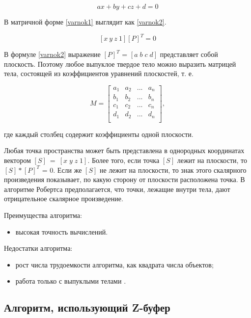 \begin{equation}
	\label{varnok1}
	ax+by+cz+d = 0
\end{equation}

В матричной форме \ref{varnok1} выглядит как \ref{varnok2}.

\begin{equation}
	\label{varnok2}
	[x \: y \: z \: 1][P]^T = 0
\end{equation}

В формуле \ref{varnok2} выражение $[P]^T$ = $[a \; b \; c \; d]$ представляет собой плоскость. Поэтому любое выпуклое твердое тело можно выразить матрицей тела, состоящей из коэффициентов уравнений плоскостей, т. е.

\begin{equation}
	M = \begin{bmatrix}
		a_1 & a_2 & ... & a_n           \\[0.3em]
		b_1 & b_2 & ... & b_n           \\[0.3em]
		c_1 & c_2 & ... & c_n           \\[0.3em]
		d_1 & d_2 & ... & d_n           \\[0.3em]
	\end{bmatrix},
\end{equation}

где каждый столбец содержит коэффициенты одной плоскости.

Любая точка пространства может быть представлена в однородных координатах вектором $[S]~=~[x \; y \; z \; 1]$. Более того, если точка $[S]$ лежит на плоскости, то $[S]*[P]^T$ = 0. Если же $[S]$ не лежит на плоскости, то знак этого скалярного произведения показывает, по какую сторону от плоскости расположена точка. В алгоритме Робертса предполагается, что точки, лежащие внутри тела, дают отрицательное скалярное произведение. 

Преимущества алгоритма:
\begin{itemize}
	\item высокая точность вычислений.
\end{itemize}

Недостатки алгоритма:
\begin{itemize}
	\item рост числа трудоемкости алгоритма, как квадрата числа объектов;
	\item работа только с выпуклыми телами \cite{demin}.
\end{itemize}

\subsection{Алгоритм, использующий Z-буфер}

